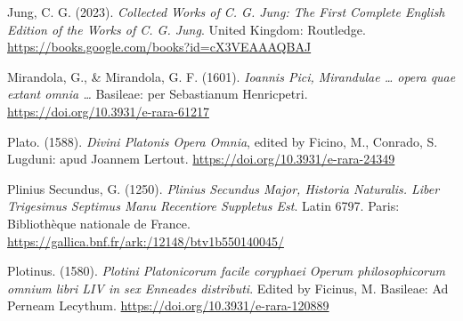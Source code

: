 \documentclass[
]{article}
\begin{document}
Jung, C. G. (2023). \emph{Collected Works of C. G. Jung: The First
Complete English Edition of the Works of C. G. Jung}. United Kingdom:
Routledge. \url{https://books.google.com/books?id=cX3VEAAAQBAJ}

Mirandola, G., \& Mirandola, G. F. (1601). \emph{Ioannis Pici,
Mirandulae \ldots{} opera quae extant omnia \ldots{}} Basileae: per
Sebastianum Henricpetri. \url{https://doi.org/10.3931/e-rara-61217}

Plato. (1588). \emph{Divini Platonis Opera Omnia}, edited by Ficino, M.,
Conrado, S. Lugduni: apud Joannem Lertout.
\url{https://doi.org/10.3931/e-rara-24349}

Plinius Secundus, G. (1250). \emph{Plinius Secundus Major, Historia
Naturalis. Liber Trigesimus Septimus Manu Recentiore Suppletus Est}.
Latin 6797. Paris: Bibliothèque nationale de France.
\url{https://gallica.bnf.fr/ark:/12148/btv1b550140045/}

Plotinus. (1580). \emph{Plotini Platonicorum facile coryphaei Operum
philosophicorum omnium libri LIV in sex Enneades distributi}. Edited by
Ficinus, M. Basileae: Ad Perneam Lecythum.
\url{https://doi.org/10.3931/e-rara-120889}
\end{document}
